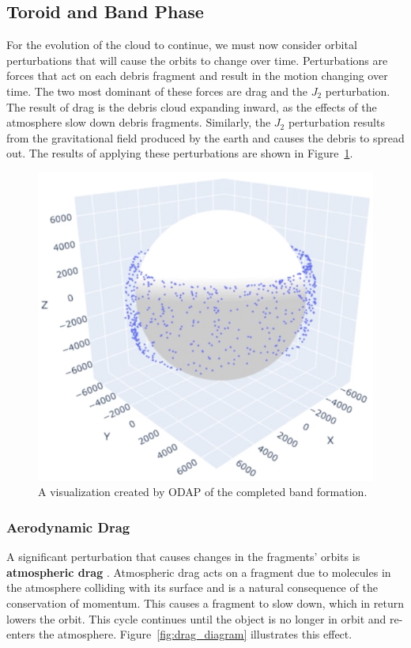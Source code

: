 \documentclass[a4paper, 12pt]{article}
\newcommand{\lindex}[1]{%
	\lowercase{\def\temp{#1}}%
	\expandafter\index\expandafter{\temp}%
}
\newcommand{\boldindex}[1]{%
	\textbf{#1}\lindex{#1}%
}
\begin{document}
\subsection{Toroid and Band Phase}
For the evolution of the cloud to continue, we must now consider orbital perturbations that will cause the orbits to change over time.  Perturbations are forces that act on each debris fragment and result in the motion changing over time. The two most dominant of these forces are drag and the $J_2$ perturbation. The result of drag is the debris cloud expanding inward, as the effects of the atmosphere slow down debris fragments. Similarly, the $J_2$ perturbation results from the gravitational field produced by the earth and causes the debris to spread out. The results of applying these perturbations are shown in Figure~\ref{band}.

\begin{figure}[h!]
	\centering
	\includegraphics[scale=0.75]{band_phase}
	\caption{A visualization created by ODAP of the completed band formation.}
	\label{band}
\end{figure}

\subsubsection{Aerodynamic Drag}

A significant perturbation that causes changes in the fragments' orbits is \boldindex{atmospheric drag}. Atmospheric drag acts on a fragment due to molecules in the atmosphere colliding with its surface and is a natural consequence of the conservation of momentum. This causes a fragment to slow down, which in return lowers the orbit. This cycle continues until the object is no longer in orbit and re-enters the atmosphere. Figure~\ref{fig:drag_diagram} illustrates this effect.
\end{document}

